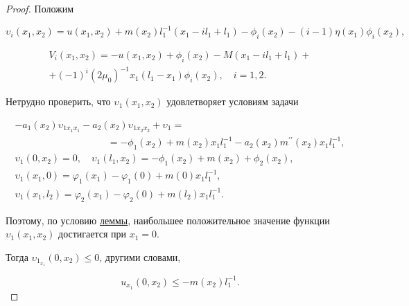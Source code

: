 \begin{proof} Положим

$$

\upsilon_i(x_1,x_2)=u(x_1,x_2)+m(x_2)l_1^{-1}(x_1-il_1+l_{1})-\phi_i(x_2)-(i-1)\eta(x_1)\phi_i(x_2),

$$

\begin{multline*}

V_i(x_1,x_2)=-u(x_1,x_2)+\phi_i(x_2)-M(x_1-il_1+l_1)+

\\

+(-1)^i(2\mu_0)^{-1}x_1(l_1-x_1)\phi_i(x_2), \quad i = 1,2.

\end{multline*}



Нетрудно проверить, что $\upsilon_1(x_1,x_2)$ удовлетворяет условиям задачи

\begin{gather*}

-a_1(x_2)\upsilon_{1{x_1x_1}}-a_2(x_2)\upsilon_{1{x_2x_2}}+\upsilon_1= \hspace{4cm} \\

\hspace{4cm} = -\phi_1(x_2)+m(x_2)x_1l_1^{-1}- a_2 (x_2) m^{\prime\prime}(x_2)x_1l_1^{-1},

\\

\upsilon_1(0, x_2)=0, \quad \upsilon_1(l_1,x_2)=-\phi_1(x_2)+m(x_2)+\phi_2(x_2),

\\

\upsilon_1(x_1, 0)=\varphi_1(x_1)-\varphi_1(0)+m(0)x_1l_1^{-1}, \\ \upsilon_1(x_1,l_2)=\varphi_2(x_1)-\varphi_2(0)+m(l_2)x_1l_1^{-1}.

\end{gather*}



Поэтому, по условию \hyperlink{ali:lemma2}{леммы}, наибольшее положительное значение функции $\upsilon_1(x_1,x_2)$ достигается при $x_1=0$. 

Тогда $\upsilon_{1_{x_1}}(0,x_2)\le0$, другими словами,

\begin{equation}

\label{ali:25}

u_{x_1}(0,x_2)\le-m(x_2)l_1^{-1}.

\end{equation}




\end{proof}
